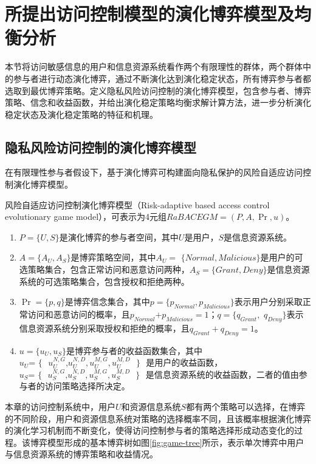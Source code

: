\section{所提出访问控制模型的演化博弈模型及均衡分析}
\label{sec:evolutionary-game-model}
本节将访问敏感信息的用户和信息资源系统看作两个有限理性的群体，两个群体中的参与者进行动态演化博弈，通过不断演化达到演化稳定状态，所有博弈参与者都选取到最优博弈策略。定义隐私风险访问控制的演化博弈模型，包含参与者、博弈策略、信念和收益函数，并给出演化稳定策略均衡求解计算方法，进一步分析演化稳定状态及演化稳定策略的特征和机理。

\subsection{隐私风险访问控制的演化博弈模型}
\label{subsec:evolutionary-game-model}
在有限理性参与者假设下，基于演化博弈可构建面向隐私保护的风险自适应访问控制演化博弈模型。
\begin{definition}
	风险自适应访问控制演化博弈模型（Risk-adaptive based access control evolutionary game model），可表示为4元组$RaBACEGM=(P,A,\Pr ,u)$。
	\begin{enumerate}
		\item $P=\{U,S\}$是演化博弈的参与者空间，其中$U$是用户，$S$是信息资源系统。
		\item $A=\{{{A}_{U}},{{A}_{S}}\}$是博弈策略空间，其中${{A}_{U}}=$ $\{Normal,Malicious\}$是用户的可选策略集合，包含正常访问和恶意访问两种，${{A}_{S}}=\{Grant,Deny\}$是信息资源系统的可选策略集合，包含授权和拒绝两种。
		\item $\Pr =\{p,q\}$是博弈信念集合，其中$p=\{{{p}_{Normal}},{{p}_{Malicious}}\}$表示用户分别采取正常访问和恶意访问的概率，且${{p}_{Normal}}\text{+}{{p}_{Malicious}}=1$；$q=\{{{q}_{Grant}},$ ${{q}_{Deny}}\}$表示信息资源系统分别采取授权和拒绝的概率，且${{q}_{Grant}}+{{q}_{Deny}}=1$。
		\item $u=\{{{u}_{U}},{{u}_{S}}\}$是博弈参与者的收益函数集合，其中${{u}_{U}}\text{= }\!\!\{\!\!\text{ }u_{U}^{N,G}\text{,}u_{U}^{N,D},u_{U}^{M,G},u_{U}^{M,D}\text{ }\!\!\}\!\!\text{ }$是用户的收益函数，${{u}_{S}}\text{= }\!\!\{\!\!\text{ }u_{S}^{N,G}\text{,}u_{S}^{N,D},u_{S}^{M,G},u_{S}^{M,D}\text{ }\!\!\}\!\!\text{ }$是信息资源系统的收益函数，二者的值由参与者的访问策略选择所决定。
		
	\end{enumerate}
\end{definition}

本章的访问控制系统中，用户$U$和资源信息系统$S$都有两个策略可以选择，在博弈的不同阶段，用户和资源信息系统对策略的选择概率不同，且该概率根据演化博弈的演化学习机制而不断变化，使得访问控制参与者的策略选择形成动态变化的过程。该博弈模型形成的基本博弈树如图\ref{fig:game-tree}所示，表示单次博弈中用户与信息资源系统的博弈策略和收益情况。

